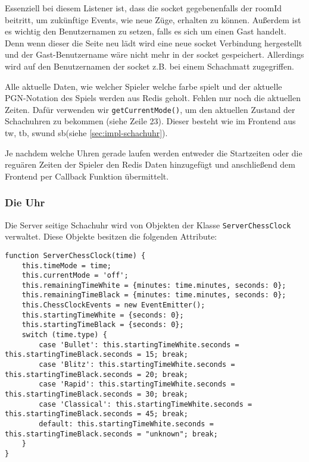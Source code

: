 Essenziell bei diesem Listener ist, dass die socket gegebenenfalls der roomId beitritt, um zukünftige Events, wie neue Züge, erhalten zu können. Außerdem ist es wichtig den Benutzernamen zu setzen, falls es sich um einen Gast handelt. Denn wenn dieser die Seite neu lädt wird eine neue socket Verbindung hergestellt und der Gast-Benutzername wäre nicht mehr in der socket gespeichert. Allerdings wird auf den Benutzernamen der socket z.B. bei einem Schachmatt zugegriffen.

Alle aktuelle Daten, wie welcher Spieler welche farbe spielt und der aktuelle PGN-Notation des Spiels werden aus Redis geholt. Fehlen nur noch die aktuellen Zeiten. Dafür verwenden wir \verb|getCurrentMode()|, um den aktuellen Zustand der Schachuhren zu bekommen (siehe Zeile 23). Dieser besteht wie im Frontend aus \glqq tw\grqq , \glqq tb\grqq , \glqq sw\grqq{ }und \glqq sb\grqq{ }(siehe \ref{sec:impl-schachuhr}).

Je nachdem welche Uhren gerade laufen werden entweder die Startzeiten oder die reguären Zeiten der Spieler den Redis Daten hinzugefügt und anschließend dem Frontend per Callback Funktion übermittelt.

\subsubsection{Die Uhr}
\label{sec:Uhr-Backend-impl}
Die Server seitige Schachuhr wird von Objekten der Klasse \verb|ServerChessClock| verwaltet. Diese Objekte besitzen die folgenden Attribute:

\begin{lstlisting}[style=codeStyle, caption={Konstruktor der ServerChessClock Klasse}, label={lst:const-ServerChessClock}]
function ServerChessClock(time) {
    this.timeMode = time;
    this.currentMode = 'off';
    this.remainingTimeWhite = {minutes: time.minutes, seconds: 0};
    this.remainingTimeBlack = {minutes: time.minutes, seconds: 0};
    this.ChessClockEvents = new EventEmitter();
    this.startingTimeWhite = {seconds: 0};
    this.startingTimeBlack = {seconds: 0};
    switch (time.type) {
        case 'Bullet': this.startingTimeWhite.seconds = this.startingTimeBlack.seconds = 15; break;
        case 'Blitz': this.startingTimeWhite.seconds = this.startingTimeBlack.seconds = 20; break;
        case 'Rapid': this.startingTimeWhite.seconds = this.startingTimeBlack.seconds = 30; break;
        case 'Classical': this.startingTimeWhite.seconds = this.startingTimeBlack.seconds = 45; break;
        default: this.startingTimeWhite.seconds = this.startingTimeBlack.seconds = "unknown"; break;
    }
}
\end{lstlisting}

